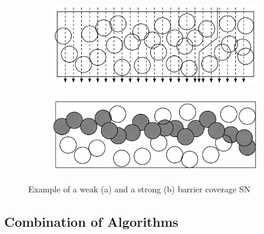 \begin{figure}
\begin{subfigure}{.5\textwidth}
  \centering
  \includegraphics[width=.8\linewidth]{images/weak-coverage.png}
  \caption{}
  \label{fig:weak}
\end{subfigure}%
\begin{subfigure}{.5\textwidth}
  \centering
  \includegraphics[width=.8\linewidth]{images/strong-coverage.png}
  \caption{}
  \label{fig:strong}
\end{subfigure}
\caption{Example of a weak (a) and a strong (b) barrier coverage \ac{SN}}
\label{fig:coverage}
\end{figure}

\FloatBarrier


\subsection{Combination of Algorithms}
\label{sec:Combination of Algorithms}


